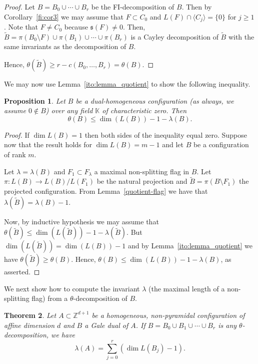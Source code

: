 \documentclass[11pt]{amsart}
\theoremstyle{plain}
\newtheorem{theorem}{Theorem}[section]
\newtheorem{proposition}[theorem]{Proposition}
\theoremstyle{definition}
\theoremstyle{remark}
\newcommand{\baseRing}[1]{\ensuremath{\mathbb{#1}}}
\newcommand{\Z}{\baseRing{Z}}
\newcommand{\beq}{\begin{equation}}
\newcommand{\eeq}{\end{equation}}
\renewcommand{\k}{{\mathbb K}}
\newcommand{\fs}{\mathfrak s}
\numberwithin{equation}{section}
\begin{document}
\begin{proof}
Let $B = B_0 \cup \cdots \cup B_r$ be the FI-decomposition of $B$.  Then by Corollary~\ref{fi:cor3}
we may assume  that $F \subset C_0$ and $L(F) \cap \langle C_j \rangle = \{0\}$ for $j\geq 1$.  Note that
$F\neq C_0$ because $\fs(F)\neq 0$.  Then, 
$\tilde B = \pi(B_0 \setminus F) \cup \pi(B_1) \cup \cdots \cup \pi(B_r)$
is a Cayley decomposition  of $\tilde B$ with the same invariants as the decomposition of $B$.  

Hence,
$\theta(\tilde B) \geq r - c(B_0,\dots,B_r) = \theta(B)$.
\end{proof}  

We may now use  Lemma~\ref{ito:lemma_quotient} to show the following inequality.

\begin{proposition}\label{ito-flag1}
Let $B$ be a dual-homogeneous configuration (as always, we assume $0 \not\in B$) over any field $\k$ of characteristic zero.  Then
\beq\label{ineq}
\theta(B) \leq \dim(L(B)) - 1 - \lambda(B).
\eeq
\end{proposition}

\begin{proof}
If $\dim L(B)  =1$ then both sides of the inequality equal zero.  Suppose now that the result holds for
 $\dim L(B) =m-1$ and let $B$ be a configuration of rank $m$.

Let $\lambda = \lambda(B)$ and $F_1 \subset F_\lambda$ a maximal non-splitting flag in $B$. 
 Let $\pi \colon L(B) \to L(B) /  L(F_1)$ be the natural projection and 
 $\tilde B = \pi(B\setminus F_1)$ the projected configuration.  From Lemma~\ref{quotient-flag} we have that 
$\lambda(\tilde B) = \lambda(B) - 1$.

Now, by inductive hypothesis we may assume that 
$\theta(\tilde B) \leq \dim(L(\tilde B)) - 1 - \lambda(\tilde B)$.
But $\dim(L(\tilde B))= \dim(L(B)) -1$ and by Lemma~\ref{ito:lemma_quotient} we have 
$\theta(\tilde B) \geq \theta(B)$.
Hence, $\theta(B) \leq \dim(L(B)) - 1 - \lambda(B)$, 
as asserted.
\end{proof}

\medskip

We next show how to compute the invariant $\lambda$  (the maximal length of a non-splitting flag)  from a $\theta$-decomposition of $B$.

\begin{theorem}\label{th:fi_dual}
Let $A \subset \Z^{d+1}$ be a homogeneous, non-pyramidal configuration of affine dimension $d$ and $B$ a Gale dual of $A$. 
If 
$  B = B_0\cup B_1 \cup \cdots \cup B_r
$
is any $\theta$-decomposition, we have
\beq\label{eq:max_lambda}
\lambda(A) =  \sum_{j=0}^r (\dim L(B_j) - 1).
\eeq
\end{theorem}
\end{document}

